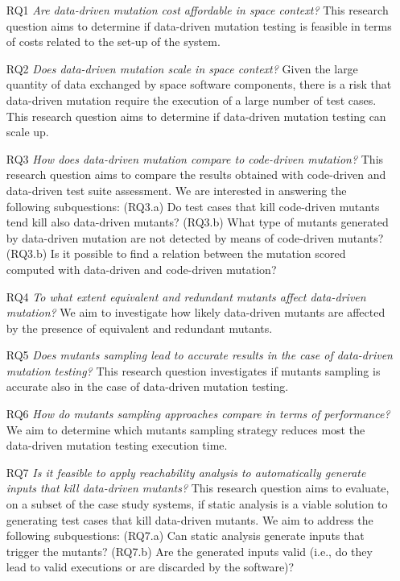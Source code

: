 \begin{itemize}

    \item[RQ1] \emph{Are data-driven mutation cost affordable in space context?} This research question aims to determine if data-driven mutation testing is feasible in terms of costs related to the set-up of the system.
    
        \item[RQ2] \emph{Does data-driven mutation scale in space context?} Given the large quantity of data exchanged by space software components, there is a risk that data-driven mutation require the execution of a large number of test cases. This research question aims to determine if data-driven mutation testing can scale up.
        
                \item[RQ3] \emph{How does data-driven mutation compare to code-driven mutation?} This research question aims to compare the results obtained with code-driven and data-driven test suite assessment. We are interested in answering the following subquestions: (RQ3.a) Do test cases that kill code-driven mutants tend kill also data-driven mutants? (RQ3.b) What type of mutants generated by data-driven mutation are not detected by means of code-driven mutants? (RQ3.b) Is it possible to find a relation between the mutation scored computed with data-driven  and code-driven mutation?
                
                \item[RQ4] \emph{To what extent equivalent and redundant mutants affect data-driven mutation?} We aim to investigate how likely data-driven mutants are affected by the presence of equivalent and redundant mutants.
                
                                \item[RQ5] \emph{Does mutants sampling lead to accurate results in the case of data-driven mutation testing?} This research question investigates if mutants sampling is accurate also in the case of data-driven mutation testing. 
                                
                                                 \item[RQ6] \emph{How do mutants sampling approaches compare in terms of performance?} We aim to determine which mutants sampling strategy reduces most the data-driven mutation testing execution time.                
                
                 \item[RQ7] \emph{Is it feasible to apply reachability analysis to automatically generate inputs that kill data-driven mutants?} This research question aims to evaluate, on a subset of the case study systems, if static analysis is a viable solution to generating test cases that kill data-driven mutants. We aim to address the following subquestions: (RQ7.a) Can static analysis generate inputs that trigger the mutants? (RQ7.b) Are the generated inputs valid (i.e., do they lead to valid executions or are discarded by the software)? 
    
    \end{itemize}
    
\ENDCHANGEDNOV    
